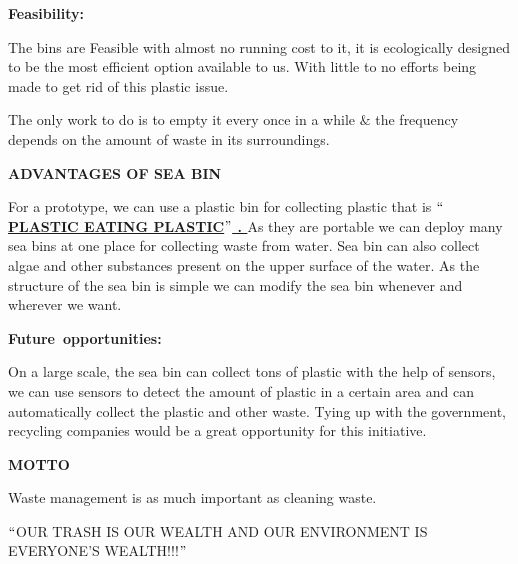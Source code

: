 \documentclass[12pt]{article}
\begin{document}
{\fontsize{24pt}{28.8pt}\selectfont \textbf{Feasibility:}\par}\par

The bins are Feasible with almost no running cost to it, it is ecologically designed to be the most efficient option available to us. With little to no efforts being made to get rid of this plastic issue.\par

The only work to do is to empty it every once in a while $\&$  the frequency depends on the amount of waste in its surroundings.\par


\vspace{\baselineskip}
{\fontsize{24pt}{28.8pt}\selectfont \textbf{ADVANTAGES OF SEA BIN}\par}\par

For a prototype, we can use a plastic bin for collecting plastic that is $``$\textbf{\uline{PLASTIC EATING PLASTIC$"$ . }}As they are portable we can deploy many sea bins at one place for collecting waste from water. Sea bin can also collect algae and other substances present on the upper surface of the water. As the structure of the sea bin is simple we can modify the sea bin whenever and wherever we want.\par


\vspace{\baselineskip}
{\fontsize{24pt}{28.8pt}\selectfont \textbf{Future\  opportunities:}\par}\par

On a large scale, the sea bin can collect tons of plastic with the help of sensors, we can use sensors to detect the amount of plastic in a certain area and can automatically collect the plastic and other waste. Tying up with the government, recycling companies would be a great opportunity for this initiative.\par


\vspace{\baselineskip}
{\fontsize{24pt}{28.8pt}\selectfont \textbf{MOTTO}\par}\par

{\fontsize{14pt}{16.8pt}\selectfont Waste management is as much important as cleaning waste.\par}\par


\vspace{\baselineskip}
{\fontsize{14pt}{16.8pt}\selectfont $``$OUR TRASH IS OUR WEALTH AND OUR ENVIRONMENT IS EVERYONE’S WEALTH!!!$"$ \par}\par


\vspace{\baselineskip}

\vspace{\baselineskip}

\vspace{\baselineskip}
{\fontsize{24pt}{28.8pt}\selectfont  \par}\par


\vspace{\baselineskip}

\printbibliography
\end{document}

